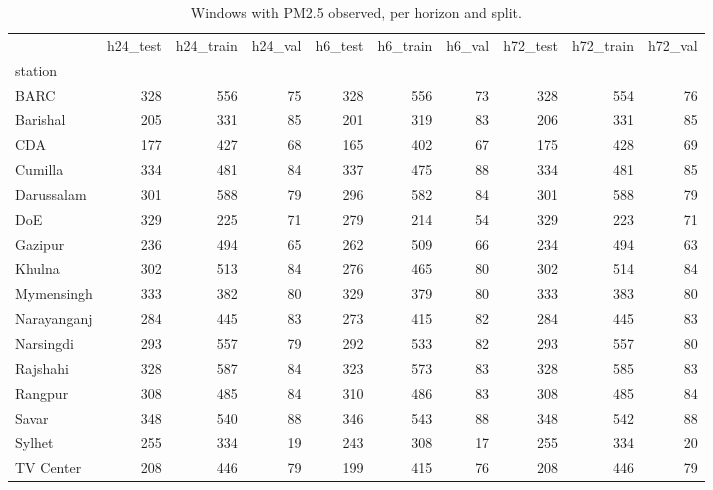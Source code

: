 \begin{table}
\caption{Windows with PM2.5 observed, per horizon and split.}
\label{tab:window_counts_pm25}
\begin{tabular}{lrrrrrrrrr}
\toprule
 & h24\_test & h24\_train & h24\_val & h6\_test & h6\_train & h6\_val & h72\_test & h72\_train & h72\_val \\
station &  &  &  &  &  &  &  &  &  \\
\midrule
BARC & 328 & 556 & 75 & 328 & 556 & 73 & 328 & 554 & 76 \\
Barishal & 205 & 331 & 85 & 201 & 319 & 83 & 206 & 331 & 85 \\
CDA & 177 & 427 & 68 & 165 & 402 & 67 & 175 & 428 & 69 \\
Cumilla & 334 & 481 & 84 & 337 & 475 & 88 & 334 & 481 & 85 \\
Darussalam & 301 & 588 & 79 & 296 & 582 & 84 & 301 & 588 & 79 \\
DoE & 329 & 225 & 71 & 279 & 214 & 54 & 329 & 223 & 71 \\
Gazipur & 236 & 494 & 65 & 262 & 509 & 66 & 234 & 494 & 63 \\
Khulna & 302 & 513 & 84 & 276 & 465 & 80 & 302 & 514 & 84 \\
Mymensingh & 333 & 382 & 80 & 329 & 379 & 80 & 333 & 383 & 80 \\
Narayanganj & 284 & 445 & 83 & 273 & 415 & 82 & 284 & 445 & 83 \\
Narsingdi & 293 & 557 & 79 & 292 & 533 & 82 & 293 & 557 & 80 \\
Rajshahi & 328 & 587 & 84 & 323 & 573 & 83 & 328 & 585 & 83 \\
Rangpur & 308 & 485 & 84 & 310 & 486 & 83 & 308 & 485 & 84 \\
Savar & 348 & 540 & 88 & 346 & 543 & 88 & 348 & 542 & 88 \\
Sylhet & 255 & 334 & 19 & 243 & 308 & 17 & 255 & 334 & 20 \\
TV Center & 208 & 446 & 79 & 199 & 415 & 76 & 208 & 446 & 79 \\
\bottomrule
\end{tabular}
\end{table}
